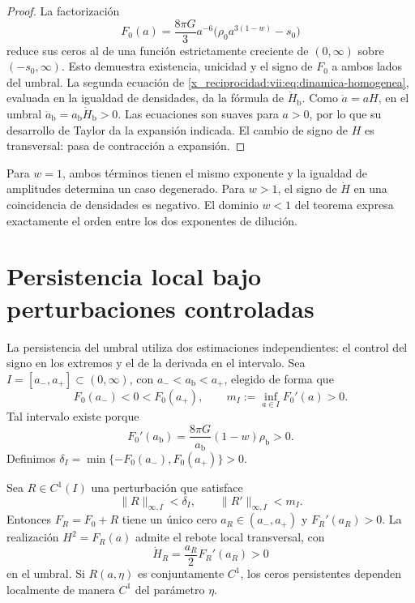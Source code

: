 \begin{proof}
La factorización
\[
 F_0(a)=\frac{8\pi G}{3}a^{-6}
             \bigl(\rho_0a^{3(1-w)}-s_0\bigr)
\]
reduce sus ceros al de una función estrictamente creciente de
\((0,\infty)\) sobre \((-s_0,\infty)\). Esto demuestra existencia,
unicidad y el signo de \(F_0\) a ambos lados del umbral.
La segunda ecuación de \eqref{x_reciprocidad:vii:eq:dinamica-homogenea}, evaluada
en la igualdad de densidades, da la fórmula de \(\dot H_{\mathrm b}\).
Como \(\dot a=aH\), en el umbral
\(\ddot a_{\mathrm b}=a_{\mathrm b}\dot H_{\mathrm b}>0\).
Las ecuaciones son suaves para \(a>0\), por lo que su desarrollo de
Taylor da la expansión indicada. El cambio de signo de \(H\) es
transversal: pasa de contracción a expansión.
\end{proof}

Para \(w=1\), ambos términos tienen el mismo exponente y la igualdad de
amplitudes determina un caso degenerado. Para \(w>1\), el signo de
\(\dot H\) en una coincidencia de densidades es negativo.
El dominio \(w<1\) del teorema expresa exactamente el orden entre los
dos exponentes de dilución.

\section{Persistencia local bajo perturbaciones controladas}
\label{x_reciprocidad:vii:sec:persistencia}

La persistencia del umbral utiliza dos estimaciones independientes:
el control del signo en los extremos y el de la derivada en el
intervalo. Sea \(I=[a_-,a_+]\subset(0,\infty)\), con
\(a_-<a_{\mathrm b}<a_+\), elegido de forma que
\[
 F_0(a_-)<0<F_0(a_+),\qquad
 m_I:=\inf_{a\in I}F_0'(a)>0.
\]
Tal intervalo existe porque
\[
 F_0'(a_{\mathrm b})
   =\frac{8\pi G}{a_{\mathrm b}}(1-w)\rho_{\mathrm b}>0.
\]
Definimos
\(\delta_I=\min\{-F_0(a_-),F_0(a_+)\}>0\).

\begin{theorem}
\label{x_reciprocidad:vii:thm:persistencia}
Sea \(R\in C^1(I)\) una perturbación que satisface
\[
 \|R\|_{\infty,I}<\delta_I,\qquad
 \|R'\|_{\infty,I}<m_I.
\]
Entonces \(F_R=F_0+R\) tiene un único cero \(a_R\in(a_-,a_+)\) y
\(F_R'(a_R)>0\). La realización \(H^2=F_R(a)\) admite el rebote local
transversal, con
\[
 \dot H_R=\frac{a_R}{2}F_R'(a_R)>0
\]
en el umbral. Si \(R(a,\eta)\) es conjuntamente \(C^1\), los ceros
persistentes dependen localmente de manera \(C^1\) del parámetro \(\eta\).
\end{theorem}

